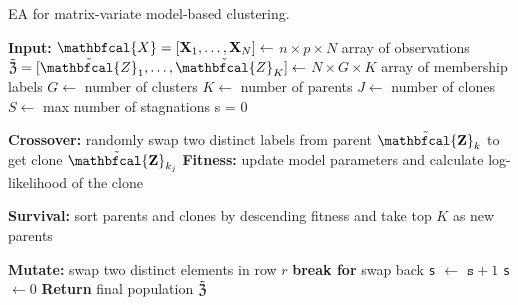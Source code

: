 \documentclass[12pt]{report}
\begin{document}
\begin{algorithm}[th]
\caption{EA for matrix-variate model-based clustering.}
\begin{algorithmic}[1]
	\Statex \textbf{Input:}
     		\Statex $ {\mathbfcal{X}} = [{\bf X}_1, \dots, {\bf X}_N ]\gets$ $n \times p \times N$ array of observations
		\Statex $ \tilde{ {\bf \mathfrak{Z} }} = [\tilde{ {\mathbfcal{Z}}}_{1}, \dots, \tilde{ {\mathbfcal{Z}}}_{K}]  \gets$ $N \times G \times K$ array of membership labels 
		 \Statex $G \gets$ number of clusters
   		 \Statex $K \gets$ number of parents
    		 \Statex $J \gets$ number of clones
    		 \Statex $S \gets$ max number of stagnations
\State s = 0

	 
		        \State \textbf{Crossover:} randomly swap two distinct labels from parent $\tilde{ {\bf \mathbfcal{Z}}}_{k}$ to get clone $\tilde{{\bf  \mathbfcal{Z}}}_{k_j}$
       			 \State \textbf{Fitness:} update model parameters and calculate log-likelihood of the clone 
		\EndFor
	\EndFor
	
	\State \textbf{Survival:} sort parents and clones by descending fitness and take top $K$ as new parents 
		
	 
        			\State \textbf{Mutate:} swap two distinct elements in row $r$ 
        				\State \textbf{break for}
     			\Else
     				\State swap back 
   			 \EndIf
        		\EndFor
        \EndFor  
        \State \texttt{s} $\gets$  $\texttt{s}  + 1$
        \Else
        \State \texttt{s} $\gets 0$ 
    \EndIf
\EndWhile
\Statex \textbf{Return} final population $\tilde{ {\bf \mathfrak{Z} }}$
\end{algorithmic}
\end{algorithm}





\end{document}
